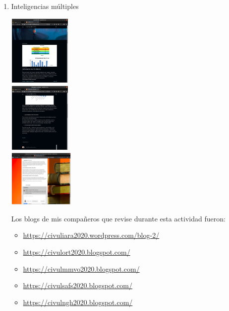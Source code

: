 \documentclass[12pt]{article}
\begin{document}
\begin{enumerate}[{\bf Sesi\'on} 1{.}]
\begin{enumerate}[{\bf Actividad} 1{.}]
				\item {Inteligencias múltiples}
					\begin{multicols}{3}		
						\includegraphics[width=0.24\textwidth] {CIVUL-U1-S3-A1-1}\\
						\includegraphics[width=0.24\textwidth] {CIVUL-U1-S3-A1-2}\\
						\includegraphics[width=0.25\textwidth] {CIVUL-U1-S3-A1-3}
					\end{multicols}
					
					\par Los blogs de mis compa\~neros que revise durante esta actividad fueron:
						\begin{itemize}
							\item \url {https://civuliara2020.wordpress.com/blog-2/}
							\item \url {https://civulort2020.blogspot.com/}
							\item \url {https://civulmmvo2020.blogspot.com/}
							\item \url {https://civulsafs2020.blogspot.com/}
							\item \url {https://civulngh2020.blogspot.com/}
						\end{itemize}
			

\end{enumerate}
\end{enumerate}
\end{document}
